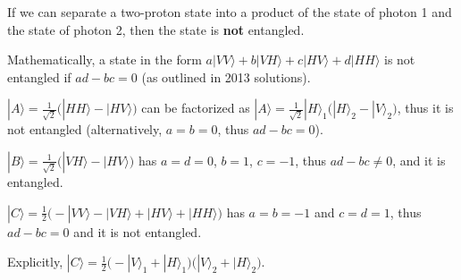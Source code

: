 If we can separate a two-proton state into a product of the state of photon 1 and the state of photon 2, then the state is \textbf{not} entangled.

Mathematically, a state in the form $a|VV\rangle + b|VH\rangle + c|HV\rangle + d|HH\rangle$ is not entangled if $ad-bc=0$ (as outlined in 2013 solutions).

$|A\rangle = \frac{1}{\sqrt{2}}\big( |HH\rangle - |HV\rangle \big)$ can be factorized as $|A\rangle = \frac{1}{\sqrt{2}} |H\rangle_1 \big( |H\rangle_2 - |V\rangle_2 \big)$, thus it is not entangled (alternatively, $a=b=0$, thus $ad-bc=0$).

$|B\rangle = \frac{1}{\sqrt{2}}\big( |VH\rangle - |HV\rangle \big)$ has $a=d=0$, $b=1$, $c=-1$, thus $ad-bc \neq 0$, and it is entangled.

$|C\rangle = \frac{1}{2} \big( -|VV\rangle - |VH\rangle + |HV\rangle + |HH\rangle \big)$ has $a=b=-1$ and $c=d=1$, thus $ad-bc = 0$ and it is not entangled.

Explicitly, $|C\rangle = \frac{1}{2} \big( -|V\rangle_1 + |H\rangle_1 \big) \big( |V\rangle_2 + |H\rangle_2 \big)$.
